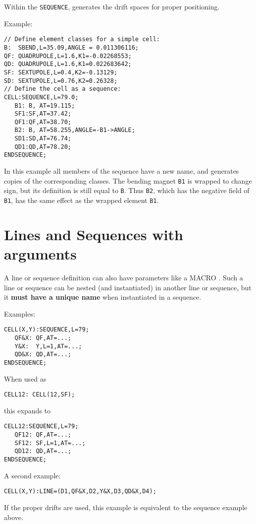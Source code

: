 Within the \texttt{SEQUENCE},
\opal generates the drift spaces for proper positioning.

Example:
\begin{verbatim}
// Define element classes for a simple cell:
B:  SBEND,L=35.09,ANGLE = 0.011306116;
QF: QUADRUPOLE,L=1.6,K1=-0.02268553;
QD: QUADRUPOLE,L=1.6,K1=0.022683642;
SF: SEXTUPOLE,L=0.4,K2=-0.13129;
SD: SEXTUPOLE,L=0.76,K2=0.26328;
// Define the cell as a sequence:
CELL:SEQUENCE,L=79.0;
   B1: B, AT=19.115;
   SF1:SF,AT=37.42;
   QF1:QF,AT=38.70;
   B2: B, AT=58.255,ANGLE=-B1->ANGLE;
   SD1:SD,AT=76.74;
   QD1:QD,AT=78.20;
ENDSEQUENCE;
\end{verbatim}
In this example all members of the sequence have a new name,
and \opal generates copies of the corresponding classes.
The bending magnet \texttt{B1} is wrapped to change sign,
but its definition is still equal to \texttt{B}.
Thus \texttt{B2}, which has the negative field of \texttt{B1},
has the same effect as the wrapped element \texttt{B1}.


\section{Lines and Sequences with arguments}
A line or sequence definition can also have parameters like a
{MACRO} .
Such a line or sequence can be nested (and instantiated) in another
line or sequence, but it \textbf{must have a unique name} when
instantiated in a sequence.
\par
Examples:
\begin{verbatim}
CELL(X,Y):SEQUENCE,L=79;
   QF&X: QF,AT=...;
   Y&X:  Y,L=1,AT=...;
   QD&X: QD,AT=...;
ENDSEQUENCE;
\end{verbatim}
When used as
\begin{verbatim}
CELL12: CELL(12,SF);
\end{verbatim}
this expands to
\begin{verbatim}
CELL12:SEQUENCE,L=79;
   QF12: QF,AT=...;
   SF12: SF,L=1,AT=...;
   QD12: QD,AT=...;
ENDSEQUENCE;
\end{verbatim}
A second example:
\begin{verbatim}
CELL(X,Y):LINE=(D1,QF&X,D2,Y&X,D3,QD&X,D4);
\end{verbatim}
If the proper drifts are used, this example is equivalent to
the sequence example above.

